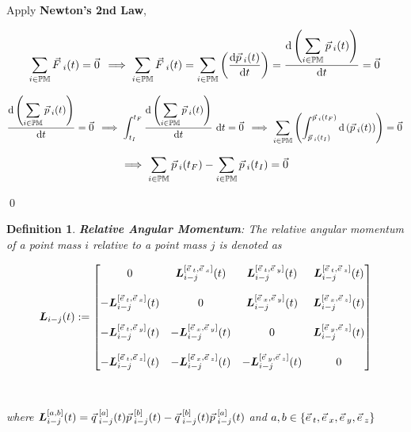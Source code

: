 \documentclass[12pt]{amsart}
\newtheorem{definition}[theorem]{Definition}
\renewenvironment{proof}{{\bfseries Proof.}}{\qed}
\let\oldvec\vec
\renewcommand{\vec}[1]{\oldvec{#1}\hspace{0.1em}}
\begin{document}
\begin{proof}

Apply \textbf{Newton's 2nd Law},

$$ \sum_{i \in \mathbb{PM}} \vec{F}_i(t)=\vec{0} \implies \sum_{i \in \mathbb{PM}} \vec{F}_i(t)= \sum_{i \in \mathbb{PM}} \left(\dfrac{\mathrm{d} \vec{p}_i (t)}{\mathrm{d} t}\right)= \dfrac{\displaystyle \mathrm{d}\left( \sum_{i \in \mathbb{PM}} \vec{p}_i (t)\right)}{\mathrm{d} t} =\vec{0} $$

$$ \dfrac{\displaystyle\mathrm{d}\left( \sum_{i \in \mathbb{PM}} \vec{p}_i (t)\right)}{\mathrm{d} t}=\vec{0} \implies \int_{t_I}^{t_F} \dfrac{\displaystyle \mathrm{d}\left( \sum_{i \in \mathbb{PM}} \vec{p}_i (t)\right)}{\mathrm{d} t} \ \mathrm{d} t = \vec{0} \implies \sum_{i \in \mathbb{PM}} \left( \int_{\vec{p}_{i}(t_I)}^{\vec{p}_{i}(t_F)} \mathrm{d} \left ( \vec{p}_i (t) \right ) \right) = \vec{0} $$

$$ \implies \sum_{i \in \mathbb{PM}} \vec{p}_{i}(t_F) - \sum_{i \in \mathbb{PM}} \vec{p}_{i}(t_I)  = \vec{0} $$

\end{proof}

\begin{definition}
\textbf{Relative Angular Momentum}: The relative angular momentum of a point mass $i$ relative to a point mass $j$ is denoted as 

$$\boldsymbol{L}_{i-j}(t) :=  \begin{bmatrix}
0 & \boldsymbol{L}^{[\vec{e}_t,\vec{e}_x]}_{i-j} (t)& \boldsymbol{L}^{[\vec{e}_t,\vec{e}_y]}_{i-j} (t)& \boldsymbol{L}^{[\vec{e}_t,\vec{e}_z]}_{i-j} (t)\\\\
-\boldsymbol{L}^{[\vec{e}_t,\vec{e}_x]}_{i-j} (t)& 0 & \boldsymbol{L}^{[\vec{e}_x,\vec{e}_y]}_{i-j} (t)& \boldsymbol{L}^{[\vec{e}_x,\vec{e}_z]}_{i-j} (t)\\\\
-\boldsymbol{L}^{[\vec{e}_t,\vec{e}_y]}_{i-j} (t)& -\boldsymbol{L}^{[\vec{e}_x,\vec{e}_y]}_{i-j}(t) & 0 & \boldsymbol{L}^{[\vec{e}_y,\vec{e}_z]}_{i-j} (t)\\\\
-\boldsymbol{L}^{[\vec{e}_t,\vec{e}_z]}_{i-j}(t) & -\boldsymbol{L}^{[\vec{e}_x,\vec{e}_z]}_{i-j} (t)& -\boldsymbol{L}^{[\vec{e}_y,\vec{e}_z]}_{i-j}(t) & 0
\end{bmatrix} $$
\\\\
where $\boldsymbol{L}^{[a,b]}_{i-j} (t) = \vec{q}^{[a]}_{i-j} (t) \vec{p}^{[b]}_{i-j} (t) - \vec{q}^{[b]}_{i-j} (t) \vec{p}^{[a]}_{i-j} (t)$ and $a, b \in \{ \vec{e}_t, \vec{e}_x, \vec{e}_y, \vec{e}_z \}$
\end{definition}
\end{document}
